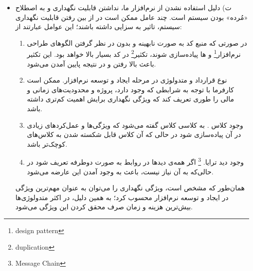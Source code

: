 \begin{itemize}
\begin{enumerate}
			\item 
			: در این نوع از نگهداری مشکل\footnote{bug}  یک قابلیت را برطرف می‌کنیم.
			\item 
			: در نوع از نگهداری سیستم را با پلتفرم جدید تطبیق و تغییر می‌دهیم.
			\item 
			: در این نوع از نگهداری برای اجتناب از بروز یک مشکل در آینده، تغییری در سیستم ایجاد می‌کنیم.
		\end{enumerate}
	در روش‌های گوناگون، سیاست‌های متفاوتی برای ویژگی نگهداری وجود دارد که عبارتند از:
		\begin{enumerate}
			\item 
			سیاست مقیم\footnote{resident}. قراردادی نوشته می‌شود تا به صورت مداوم سیستم نگهداری شود.
			\item 
			سیاست . این سیاست به این معنی است که هر موقع سیستم دچار اشکال شد و یا کارفرما ویژگی جدیدی را خواست، از سیستم نگهداری می‌شود.
			\item 
			سیاست دوره‌ای\footnote{periodical}. این سیاست به این معنی است که از سیستم در بازه‌های زمانی مشخص نگهداری می‌شود.
		\end{enumerate}
	\item 
	ت) دلیل استفاده نشدن از نرم‌افزار ما، نداشتن قابلیت نگهداری و به اصطلاح «مُرده» بودن سیستم است. چند عامل ممکن است در از بین رفتن قابلیت نگهداری سیستم، تاثیر به سزایی داشته باشند؛ این عوامل عبارتند از:
	 	\begin{enumerate}
	 		\item
	 		در صورتی که منبع کد به صورت نابهینه و بدون در نظر گرفتن الگوهای طراحی نرم‌افزار\footnote{design pattern} و ها پیاده‌سازی شوند، تکثیر\footnote{duplication} در کد بسیار بالا خواهد بود. این تکثیر باعث بالا رفتن  و در نتیجه پایین آمدن  می‌شود.
	 		\item 
	 		نوع قرارداد و متدولوژی در مرحله ایجاد و توسعه نرم‌افزار. ممکن است کارفرما با توجه به شرابطی که وجود دارد، پروژه و محدودیت‌های زمانی و مالی را طوری تعریف کند که ویژگی نگهداری برایش اهمیت کم‌تری داشته باشد.
	 		
	 		\item 
	 		وجود کلاس . به کلاسی کلاس  گفته می‌شود که ویژگی‌ها و عمل‌کرد‌های زیادی در آن پیاده‌سازی شود در حالی که آن کلاس قابل شکسته شدن به کلاس‌های کوچک‌تر باشد.
	 		\item 
	 		وجود دید ترایا. \footnote{Message Chain} اگر همه‌ی دید‌ها در روابط به صورت دوطرفه تعریف شود در حالی‌که به آن نیاز نیست، باعث به وجود آمدن این عارضه می‌شود.
	 	\end{enumerate}
 	
 	همان‌طور که مشخص است، ویژگی نگهداری را می‌توان به عنوان مهم‌ترین ویژگی در ایجاد و توسعه نرم‌افزار محسوب کرد؛ به همین دلیل، در اکثر متدولوژی‌ها بیش‌ترین هزینه و زمان صرف محقق کردن این ویژگی می‌شود.
	\end{itemize}